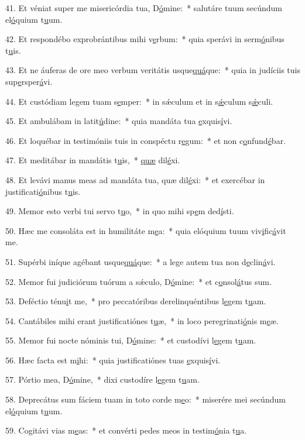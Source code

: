 41. Et véniat super me misericórdia tua, D\uline{ó}mine:~* salutáre tuum secúndum el\uline{ó}quium t\uline{u}um.\par 
42. Et respondébo exprobrántibus mihi v\uline{e}rbum:~* quia sperávi in serm\uline{ó}nibus t\uline{u}is.\par 
43. Et ne áuferas de ore meo verbum veritátis usque\uline{quá}que:~* quia in judíciis tuis sup\uline{e}rsper\uline{á}vi.\par 
44. Et custódiam legem tuam s\uline{e}mper:~* in sǽculum et in s\uline{ǽ}culum s\uline{ǽ}culi.\par 
45. Et ambulábam in latit\uline{ú}dine:~* quia mandáta tua \uline{e}xquis\uline{í}vi.\par 
46. Et loquébar in testimóniis tuis in conspéctu r\uline{e}gum:~* et non c\uline{o}nfund\uline{é}bar.\par 
47. Et meditábar in mandátis t\uline{u}is,~* \uline{quæ} dil\uline{é}xi.\par 
48. Et levávi manus meas ad mandáta tua, quæ dil\uline{é}xi:~* et exercébar in justificati\uline{ó}nibus t\uline{u}is.\par 
49. Memor esto verbi tui servo t\uline{u}o,~* in quo mihi sp\uline{e}m ded\uline{í}sti.\par 
50. Hæc me consoláta est in humilitáte m\uline{e}a:~* quia elóquium tuum viv\uline{i}fic\uline{á}vit me.\par 
51. Supérbi iníque agébant usque\uline{quá}que:~* a lege autem tua non d\uline{e}clin\uline{á}vi.\par 
52. Memor fui judiciórum tuórum a sǽculo, D\uline{ó}mine:~* et c\uline{o}nsol\uline{á}tus sum.\par 
53. Deféctio ténu\uline{i}t me,~* pro peccatóribus derelinquéntibus l\uline{e}gem t\uline{u}am.\par 
54. Cantábiles mihi erant justificatiónes t\uline{u}æ,~* in loco peregrinati\uline{ó}nis m\uline{e}æ.\par 
55. Memor fui nocte nóminis tui, D\uline{ó}mine:~* et custodívi l\uline{e}gem t\uline{u}am.\par 
56. Hæc facta est m\uline{i}hi:~* quia justificatiónes tuas \uline{e}xquis\uline{í}vi.\par 
57. Pórtio mea, D\uline{ó}mine,~* dixi custodíre l\uline{e}gem t\uline{u}am.\par 
58. Deprecátus sum fáciem tuam in toto corde m\uline{e}o:~* miserére mei secúndum el\uline{ó}quium t\uline{u}um.\par 
59. Cogitávi vias m\uline{e}as:~* et convérti pedes meos in testim\uline{ó}nia t\uline{u}a.\par 
